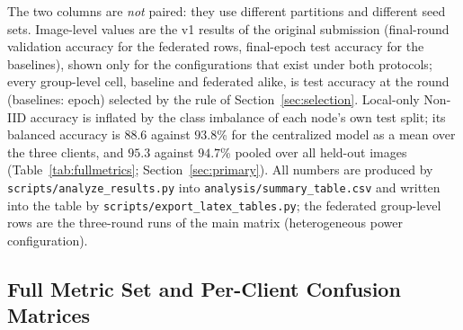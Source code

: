 \documentclass[journal]{IEEEtran}
\begin{document}
\begin{table}[t]
\centering
\caption{Effect of the Partitioning Protocol on the Reported \emph{Accuracy} (3-Node, mean $\pm$ std over seeds). Accuracy is the secondary metric of this study (Section~\ref{sec:primary}); it is the quantity shown here because the comparison is precisely about how much accuracy the leaked protocol added. Balanced accuracy, the primary metric, is in Table~\ref{tab:fullmetrics}}
\label{tab:protocol_effect}

\vspace{2pt}
\footnotesize{The two columns are \emph{not} paired: they use different partitions and different seed sets. Image-level values are the v1 results of the original submission (final-round validation accuracy for the federated rows, final-epoch test accuracy for the baselines), shown only for the configurations that exist under both protocols; every group-level cell, baseline and federated alike, is test accuracy at the round (baselines: epoch) selected by the rule of Section~\ref{sec:selection}. Local-only Non-IID accuracy is inflated by the class imbalance of each node's own test split; its balanced accuracy is $88.6$ against $93.8$\% for the centralized model as a mean over the three clients, and $95.3$ against $94.7$\% pooled over all held-out images (Table~\ref{tab:fullmetrics}; Section~\ref{sec:primary}). All numbers are produced by \texttt{scripts/analyze\_results.py} into \texttt{analysis/summary\_table.csv} and written into the table by \texttt{scripts/export\_latex\_tables.py}; the federated group-level rows are the three-round runs of the main matrix (heterogeneous power configuration).}
\end{table}

\subsection{Full Metric Set and Per-Client Confusion Matrices}
\label{sec:res_metrics}
\end{document}
